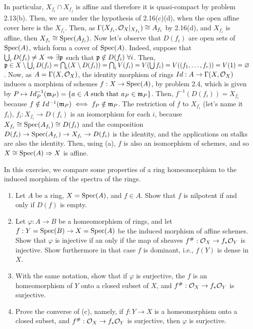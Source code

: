 \begin{sol}
\begin{enumerate}[label=\alph*)]
		In particular, $X_{f_i} \cap X_{f_j}$ is affine and therefore it is quasi-compact by problem 2.13(b). Then, we are under the hypothesis of 2.16(c)(d), when the open affine cover here is the $X_{f_i}$. Then, as $\Gamma(X_{f_i}, \mathcal{O}_X|_{X_{f_i}}) \cong A_{f_i}$ by 2.16(d), and $X_{f_i}$ is affine, then $X_{f_i} \cong \mathrm{Spec}(A_{f_i})$. Now let's observe that $D(f_i)$ are open sets of $\mathrm{Spec}(A)$, which form a cover of $\mathrm{Spec}(A)$. Indeed, suppose that $\bigcup_{i} D(f_i) \neq X \Rightarrow \exists \mathfrak{p}$ such that $\mathfrak{p} \notin D(f_i) \, \, \forall i$. Then, $\mathfrak{p} \in X \setminus \bigcup_{i} D(f_i) = \bigcap_i (X \setminus D(f_i)) = \bigcap_i V(f_i) = V(\bigcup f_i) = V((f_1, \dots, f_r)) = V(1) = \varnothing$. Now, as $A = \Gamma(X, \mathcal{O}_X)$, the identity morphism of rings $Id: A \to \Gamma(X, \mathcal{O}_X)$ induces a morphism of schemes $f: X \to \mathrm{Spec}(A)$, by problem 2.4, which is given by $P \mapsto Id^{-1}_P(\mathfrak{m}_P) = \{a \in A \text{ such that } a_P \in \mathfrak{m}_P\}$. Then, $f^{-1}(D(f_i)) = X_{f_i}$ because $f \notin Id^{-1}(\mathfrak{m}_P) \iff f_P \notin \mathfrak{m}_P$. The restriction of $f$ to $X_{f_i}$ (let's name it $f_i$), $f_i: X_{f_i} \to D(f_i)$ is an isomorphism for each $i$, because $X_{f_i} \cong \mathrm{Spec}(A_{f_i}) \cong D(f_i)$ and the composition $D(f_i) \to \mathrm{Spec}(A_{f_i}) \to X_{f_i} \to D(f_i)$ is the identity, and the applications on stalks are also the identity. Then, using (a), $f$ is also an isomorphism of schemes, and so $X \cong \mathrm{Spec}(A) \Rightarrow X$ is affine.
	\end{enumerate}
\end{sol}

\begin{ex}
	In this exercise, we compare some properties of a ring homeomorphism to the induced morphism of the spectra of the rings.
	\begin{enumerate}[label=\alph*)]
		\item Let $A$ be a ring, $X = \mathrm{Spec}(A)$, and $f \in A$. Show that $f$ is nilpotent if and only if $D(f)$ is empty.

		\item Let $\varphi: A \to B$ be a homeomorphism of rings, and let $f: Y = \mathrm{Spec}(B) \to X = \mathrm{Spec}(A)$ be the induced morphism of affine schemes. Show that $\varphi$ is injective if an only if the map of sheaves $f^{\#}: \mathcal{O}_X \to f_*\mathcal{O}_Y$ is injective. Show furthermore in that case $f$ is dominant, i.e., $f(Y)$ is dense in $X$.

		\item With the same notation, show that if $\varphi$ is surjective, the $f$ is an homeomorphism of $Y$ onto a closed subset of $X$, and $f^{\#}: \mathcal{O}_X \to f_*\mathcal{O}_Y$ is surjective.

		\item Prove the converse of (c), namely, if $f: Y \to X$ is a homeomorphism onto a closed subset, and $f^{\#}: \mathcal{O}_X \to f_*\mathcal{O}_Y$ is surjective, then $\varphi$ is surjective.
	\end{enumerate}
\end{ex}

